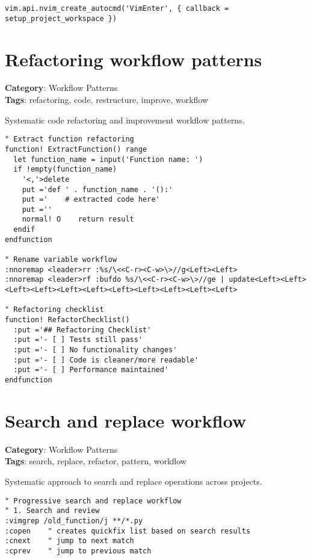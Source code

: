 {{{{{{{{{{{{{{{{{{\begin{Exa*}{}
\begin{Verbatim}[fontsize=\footnotesize, breaklines, breakanywhere]
vim.api.nvim_create_autocmd('VimEnter', { callback = setup_project_workspace })
\end{Verbatim}
\end{Exa*}

\section{Refactoring workflow patterns}

\textbf{Category}: Workflow Patterns\\ \textbf{Tags}: refactoring, code, restructure, improve, workflow
\vspace{0.5cm}

Systematic code refactoring and improvement workflow patterns.

\begin{Exa*}{}
\begin{Verbatim}[fontsize=\footnotesize, breaklines, breakanywhere]
" Extract function refactoring
function! ExtractFunction() range
  let function_name = input('Function name: ')
  if !empty(function_name)
    '<,'>delete
    put ='def ' . function_name . '():'
    put ='    # extracted code here'
    put =''
    normal! O    return result
  endif
endfunction

" Rename variable workflow  
:nnoremap <leader>rr :%s/\<<C-r><C-w>\>//g<Left><Left>
:nnoremap <leader>rf :bufdo %s/\<<C-r><C-w>\>//ge | update<Left><Left><Left><Left><Left><Left><Left><Left><Left><Left><Left>

" Refactoring checklist
function! RefactorChecklist()
  :put ='## Refactoring Checklist'
  :put ='- [ ] Tests still pass'
  :put ='- [ ] No functionality changes'  
  :put ='- [ ] Code is cleaner/more readable'
  :put ='- [ ] Performance maintained'
endfunction
\end{Verbatim}
\end{Exa*}

\section{Search and replace workflow}

\textbf{Category}: Workflow Patterns\\ \textbf{Tags}: search, replace, refactor, pattern, workflow
\vspace{0.5cm}

Systematic approach to search and replace operations across projects.

\begin{Exa*}{}
\begin{Verbatim}[fontsize=\footnotesize, breaklines, breakanywhere]
" Progressive search and replace workflow
" 1. Search and review
:vimgrep /old_function/j **/*.py
:copen    " creates quickfix list based on search results
:cnext    " jump to next match
:cprev    " jump to previous match


\end{Verbatim}
\end{Exa*}}}}}}}}}}}}}}}}}}}
